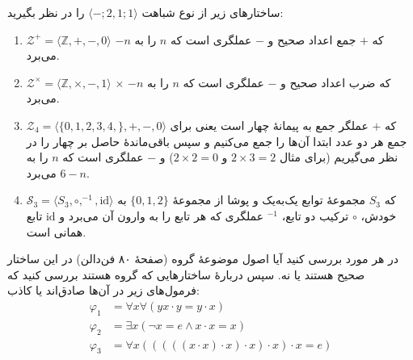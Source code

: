 ساختارهای زیر از نوع شباهت
$\langle\mathord{-};2,1;1\rangle$
را در نظر بگیرید:
\begin{enumerate}[label=(\alph*)]
    \item $\mathcal{Z^+}=\langle\mathbb{Z},+,-,0\rangle$
    که
    $+$ جمع اعداد صحیح و
    $-$ عملگری است که $n$ را به $-n$ می‌برد.
    \item $\mathcal{Z^\times}=\langle\mathbb{Z},\times,-, 1\rangle$
    $\times$ که ضرب اعداد صحیح و
    $-$ عملگری است که $n$ را به $-n$ می‌برد.
    \item $\mathcal{Z}_4=\langle\{0,1,2,3,4,\},+,-, 0\rangle$
    که $+$ عملگر جمع به پیمانهٔ چهار است یعنی برای جمع هر دو عدد ابتدا آن‌ها را جمع می‌کنیم و سپس باقی‌ماندهٔ حاصل بر چهار را در نظر می‌گیریم
    (برای مثال
    $2\times 3=2$
    و
    $2\times 2=0$)
    و
    $-$
    عملگری است که $n$ را به $6-n$ می‌برد.
    \item $\mathcal{S}_3=\langle S_3, \circ,^{-1},\text{id}\rangle$
    که
    $S_3$
    مجموعهٔ توابع یک‌به‌یک و پوشا از مجموعهٔ
    $\{0,1,2\}$
    به خودش،
    $\circ$
    ترکیب دو تابع،
    $^{-1}$
    عملگری که هر تابع را به وارون آن می‌برد و
    $\text{id}$
    تابع همانی است.
\end{enumerate}
در هر مورد بررسی کنید آیا اصول موضوعهٔ گروه
(صفحهٔ ۸۰ فن‌دالن)
در این ساختار صحیح هستند یا نه. سپس دربارهٔ ساختارهایی که گروه هستند بررسی کنید که فرمول‌های زیر در آن‌ها صادق‌اند یا کاذب:
\begin{align*}
    \varphi_1 &= \forall x\forall (y x\cdot y = y\cdot x) \\
    \varphi_2 &= \exists x (\neg x = e \wedge x\cdot x = x) \\
    \varphi_3 &= \forall x (((((x\cdot x)\cdot x)\cdot x)\cdot x)\cdot x = e)
\end{align*}